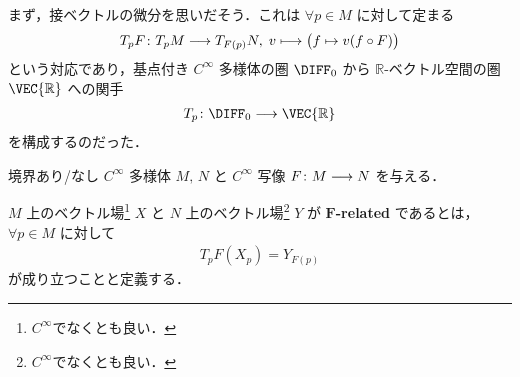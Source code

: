 \documentclass[TQFT_main]{subfiles}
\begin{document}
まず，接ベクトルの微分を思いだそう．これは $\forall p \in M$ に対して定まる
\begin{align}
    T_{p} F \colon T_p M \longrightarrow T_{F(p)} N,\; v \longmapsto \bigl(f \mapsto v(f \circ F)\bigr)
\end{align}
という対応であり，基点付き $C^\infty$ 多様体の圏 $\DIFF_0$ から $\mathbb{R}$-ベクトル空間の圏 $\VEC{\mathbb{R}}$ への関手
\begin{align}
    T_p \colon \DIFF_0 \lto \VEC{\mathbb{R}}
\end{align}
を構成するのだった．

\begin{mydef}[label=def:F-related]{}
    境界あり/なし $C^\infty$ 多様体 $M,\, N$ と $C^\infty$ 写像 $F \colon M \longrightarrow N$ を与える．

    $M$ 上のベクトル場\footnote{\hyperref[def:vecf]{$C^\infty$}でなくとも良い．} $X$ と $N$ 上のベクトル場\footnote{\hyperref[def:vecf]{$C^\infty$}でなくとも良い．} $Y$ が $\bm{F}$\textbf{-related} であるとは，
    $\forall p \in M$ に対して
    \begin{align}
        T_p F (X_p) = Y_{F(p)}
    \end{align}
    が成り立つことと定義する．
\end{mydef}
\end{document}

